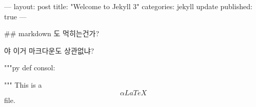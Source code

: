 ---
layout: post
title:  "Welcome to Jekyll 3"
categories: jekyll update
published: true
---

## markdown 도 먹히는건가?

야 이거 마크다운도 상관없냐?

"""py
def consol:

"""
This is a $$\alpha{LaTeX}$$ file.